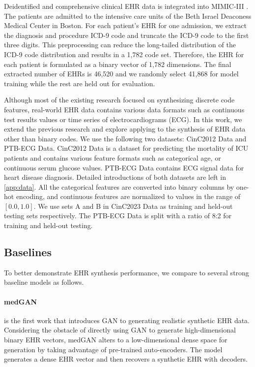 Deidentified and comprehensive clinical EHR data is integrated into MIMIC-III \citep{Johnson2016MIMICIIIAF}. The patients are admitted to the intensive care units of the Beth Israel Deaconess Medical Center in Boston. For each patient's EHR for one admission, we extract the diagnosis and procedure ICD-9 code and truncate the ICD-9 code to the first three digits. This preprocessing can reduce the long-tailed distribution of the ICD-9 code distribution and results in a 1,782 code set. Therefore, the EHR for each patient is formulated as a binary vector of 1,782 dimensions. The final extracted number of EHRs is 46,520 and we randomly select 41,868 for model training while the rest are held out for evaluation. 

Although most of the existing research focused on synthesizing discrete code features, real-world EHR data contains various data formats such as continuous test results values or time series of electrocardiograms (ECG). In this work, we extend the previous research and explore applying \modelname to the synthesis of EHR data other than binary codes. We use the following two datasets: CinC2012 Data and PTB-ECG Data. CinC2012 Data is a dataset for predicting the mortality of ICU patients and contains various feature formats such as categorical age, or continuous serum glucose values. PTB-ECG Data contains ECG signal data for heart disease diagnosis. Detailed introductions of both datasets are left in \ref{app:data}.
All the categorical features are converted into binary columns by one-hot encoding, and continuous features are normalized to values in the range of $[0.0, 1.0]$. We use sets A and B in CinC2023 Data as training and held-out testing sets respectively. The PTB-ECG Data is split with a ratio of 8:2 for training and held-out testing.

\subsection{Baselines}

To better demonstrate EHR synthesis performance, we compare \modelname to several strong baseline models as follows.

\paragraph{medGAN} \citep{pmlr-v68-choi17a} is the first work that introduces GAN to generating realistic synthetic EHR data. Considering the obstacle of directly using GAN to generate high-dimensional binary EHR vectors, medGAN alters to a low-dimensional dense space for generation by taking advantage of pre-trained auto-encoders. The model generates a dense EHR vector and then recovers a synthetic EHR with decoders.

